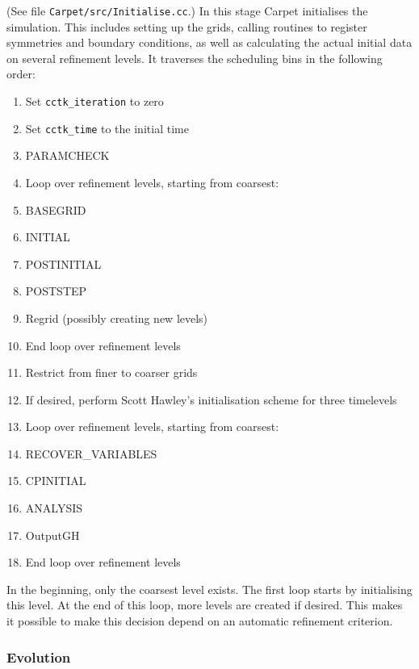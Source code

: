 \documentclass{article}
\begin{document}
   (See file \texttt{Carpet/src/Initialise.cc}.)  In this stage Carpet
   initialises the simulation.  This includes setting up the grids,
   calling routines to register symmetries and boundary conditions, as
   well as calculating the actual initial data on several refinement
   levels.  It traverses the scheduling bins in the following order:
\begin{enumerate}
\itemsep 0pt
\item
   Set \texttt{cctk\_iteration} to zero
\item
   Set \texttt{cctk\_time} to the initial time
\item
   PARAMCHECK
\item
   Loop over refinement levels, starting from coarsest:
\item \quad
   BASEGRID
\item \quad
   INITIAL
\item \quad
   POSTINITIAL
\item \quad
   POSTSTEP
\item \quad
   Regrid (possibly creating new levels)
\item
   End loop over refinement levels
\item
   Restrict from finer to coarser grids
\item
   If desired, perform Scott Hawley's initialisation scheme for three
   timelevels
\item
   Loop over refinement levels, starting from coarsest:
\item \quad
   RECOVER\_VARIABLES
\item \quad
   CPINITIAL
\item \quad
   ANALYSIS
\item \quad
   OutputGH
\item
   End loop over refinement levels
\end{enumerate}

   In the beginning, only the coarsest level exists.  The first loop
   starts by initialising this level.  At the end of this loop, more
   levels are created if desired.  This makes it possible to make this
   decision depend on an automatic refinement criterion.



\subsubsection{Evolution}
\end{document}
